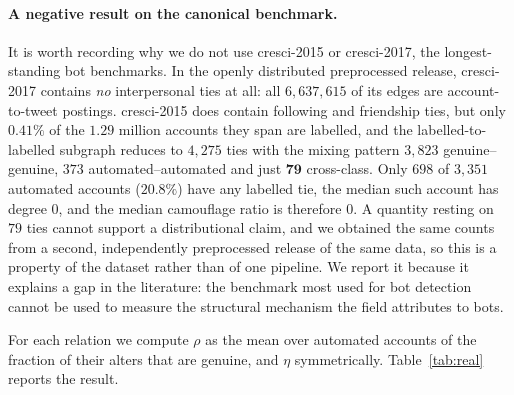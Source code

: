 \documentclass[../elsevier.tex]{subfiles}
\begin{document}
\paragraph{A negative result on the canonical benchmark.}
It is worth recording why we do not use cresci-2015 or cresci-2017, the
longest-standing bot benchmarks. In the openly distributed preprocessed release,
cresci-2017 contains \emph{no} interpersonal ties at all: all $6{,}637{,}615$ of its
edges are account-to-tweet postings. cresci-2015 does contain following and
friendship ties, but only $0.41\%$ of the $1.29$ million accounts they span are
labelled, and the labelled-to-labelled subgraph reduces to $4{,}275$ ties with the
mixing pattern $3{,}823$ genuine--genuine, $373$ automated--automated and just
$\mathbf{79}$ cross-class. Only $698$ of $3{,}351$ automated accounts ($20.8\%$) have
any labelled tie, the median such account has degree $0$, and the median camouflage
ratio is therefore $0$. A quantity resting on $79$ ties cannot support a
distributional claim, and we obtained the same counts from a second, independently
preprocessed release of the same data, so this is a property of the dataset rather
than of one pipeline. We report it because it explains a gap in the literature: the
benchmark most used for bot detection cannot be used to measure the structural
mechanism the field attributes to bots.

For each relation we compute $\rho$ as the mean over automated accounts of the
fraction of their alters that are genuine, and $\eta$ symmetrically.
Table~\ref{tab:real} reports the result.
\end{document}
